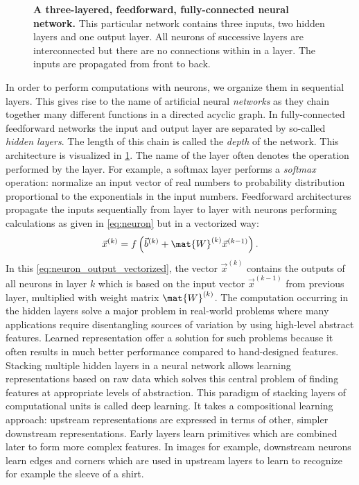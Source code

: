 \begin{figure}[htbp]
	\centering
	
	\caption[A three-layered, feedforward, fully-connected neural network.]{\textbf{A three-layered, feedforward, fully-connected neural network.} This particular network contains three inputs, two hidden layers and one output layer. All neurons of successive layers are interconnected but there are no connections within in a layer. The inputs are propagated from front to back.}
	\label{fig:three-layer-nn}
\end{figure}

In order to perform computations with neurons, we organize them in sequential layers. This gives rise to the name of artificial neural \textit{networks} as they chain together many different functions in a directed acyclic graph. In fully-connected feedforward networks the input and output layer are separated by so-called \textit{hidden layers}. The length of this chain is called the \emph{depth} of the network. This architecture is visualized in \cref{fig:three-layer-nn}. The name of the layer often denotes the operation performed by the layer. For example, a softmax layer performs a \emph{softmax} operation: normalize an input vector of real numbers to probability distribution proportional to the exponentials in the input numbers. Feedforward architectures propagate the inputs sequentially from layer to layer with neurons performing calculations as given in \cref{eq:neuron} but in a vectorized way:
\begin{equation} \label{eq:neuron_output_vectorized}
	\vec{x}^{(k)}=f\left(\vec{b}^{(k)} + \mat{W}^{(k)} \vec{x}^{(k-1)}\right).
\end{equation}
In this \cref{eq:neuron_output_vectorized}, the vector $\vec{x}^{(k)}$ contains the outputs of all neurons in layer $k$ which is based on the input vector $\vec{x}^{(k-1)}$ from previous layer, multiplied with weight matrix $\mat{W}^{(k)}$. The computation occurring in the hidden layers solve a major problem in real-world problems where many applications require disentangling sources of variation by using high-level abstract features. Learned representation offer a solution for such problems because it often results in much better performance compared to hand-designed features. Stacking multiple hidden layers in a neural network allows learning representations based on raw data which solves this central problem of finding features at appropriate levels of abstraction. This paradigm of stacking layers of computational units is called deep learning. It takes a compositional learning approach: upstream representations are expressed in terms of other, simpler downstream representations. Early layers learn primitives which are combined later to form more complex features. In images for example, downstream neurons learn edges and corners which are used in upstream layers to learn to recognize for example the sleeve of a shirt.

